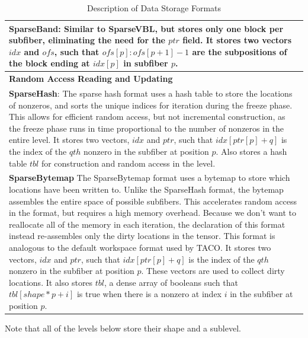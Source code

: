 \begin{table}[ht]
\begin{tabular}{p{14cm}}
    \textbf{SparseBand}: Similar to SparseVBL, but stores only one block per subfiber, eliminating the need for the $ptr$ field. It stores two vectors $idx$ and $ofs$, such that $ofs[p]:ofs[p + 1] - 1$ are the subpositions of the block ending at $idx[p]$ in subfiber $p$. \\
    \hline
    \textbf{Random Access Reading and Updating} \\
    \hline
    \textbf{SparseHash}:
    The sparse hash format uses a hash table to store the locations of nonzeros, and sorts the unique indices for iteration during the freeze phase.
    This allows for efficient random access, but not incremental construction, as the freeze phase runs in time proportional to the number of nonzeros in the entire level.
    It stores two vectors, $idx$ and $ptr$, such that $idx[ptr[p] + q]$ is the index of the $qth$ nonzero in the subfiber at position $p$. 
    Also stores a hash table $tbl$ for construction and random access in the level. \\
    \textbf{SparseBytemap}
    The SparseBytemap format uses a bytemap to store which locations have been written to.
    Unlike the SparseHash format, the bytemap assembles the entire space of possible subfibers.
    This accelerates random access in the format, but requires a high memory overhead.
    Because we don't want to reallocate all of the memory in each iteration, the declaration of this format instead re-assembles only the dirty locations in the tensor.
    This format is analogous to the default workspace format used by TACO.
    It stores two vectors, $idx$ and $ptr$, such that $idx[ptr[p] + q]$ is the index of the $qth$ nonzero in the subfiber at position $p$.
    These vectors are used to collect dirty locations.
    It also stores $tbl$, a dense array of booleans such that $tbl[shape * p + i]$ is true when there is a nonzero at index $i$ in the subfiber at position $p$. \\
    \hline
    \end{tabular}
    \caption{Description of Data Storage Formats}
    \label{table:formats}
\end{table}
    

 Note that all of the levels below store their shape and a sublevel.


